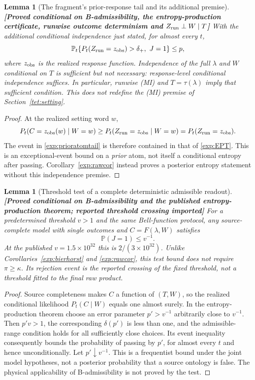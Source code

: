 \documentclass[11pt,a4paper]{article}
\newtheorem{lemma}[theorem]{Lemma}
\theoremstyle{definition}
\theoremstyle{remark}\newtheorem{remark}[theorem]{Remark}
\newcommand{\status}[1]{\textbf{[#1]}\quad}
\newcommand{\Prb}{\mathbb P}
\begin{document}
\begin{lemma}[The fragment's prior-response tail and its additional premise]\label{exp:prioratom}
\status{Proved conditional on B-admissibility, the entropy-production certificate, runwise outcome determinism and $Z_{\rm run}\perp W\mid T$}
With the additional conditional independence just stated, for almost every $t$,
\begin{equation}\label{exp:prioratomtail}
 \Prb_t\{P_t(Z_{\rm run}=z_{\rm obs})>\delta_+,\ J=1\}\le p,
\end{equation}
where $z_{\rm obs}$ is the realized response function. Independence of the full $\lambda$ and $W$ conditional on $T$ is sufficient but not necessary: response-level conditional independence suffices. In particular, runwise (MI) and $T=\tau(\lambda)$ imply that sufficient condition. This does not redefine the (MI) premise of Section~\ref{tet:setting}.
\end{lemma}
\begin{proof}
At the realized setting word $w$,
\[
 P_t(C=z_{\rm obs}(w)\mid W=w)
 \ge P_t(Z_{\rm run}=z_{\rm obs}\mid W=w)
 =P_t(Z_{\rm run}=z_{\rm obs}).
\]
The event in \eqref{exp:prioratomtail} is therefore contained in that of \eqref{exp:EPT}. This is an exceptional-event bound on a \emph{prior} atom, not itself a conditional entropy after passing. Corollary~\ref{exp:rawcor} instead proves a posterior entropy statement without this independence premise.
\end{proof}

\begin{lemma}[Threshold test of a complete deterministic admissible readout]\label{exp:thresholdtest}
\status{Proved conditional on B-admissibility and the published entropy-production theorem; reported threshold crossing imported}
For a predetermined threshold $v>1$ and the same Bell-function protocol, any source-complete model with single outcomes and $C=F(\lambda,W)$ satisfies
\[
 \Prb(J=1)\le v^{-1}.
\]
At the published $v=1.5\times10^{32}$ this is $2/(3\times10^{32})$. Unlike Corollaries~\ref{exp:bierhorst} and \ref{exp:rawcor}, this test bound does not require $\pi\ge\kappa$. Its rejection event is the reported crossing of the fixed threshold, not a threshold fitted to the final raw product.
\end{lemma}
\begin{proof}
Source completeness makes $C$ a function of $(T,W)$, so the realized conditional likelihood $P_t(C\mid W)$ equals one almost surely. In the entropy-production theorem choose an error parameter $p'>v^{-1}$ arbitrarily close to $v^{-1}$. Then $p'v>1$, the corresponding $\delta(p')$ is less than one, and the admissible-range condition holds for all sufficiently close choices. Its event inequality consequently bounds the probability of passing by $p'$, for almost every $t$ and hence unconditionally. Let $p'\downarrow v^{-1}$.
This is a frequentist bound under the joint model hypotheses, not a posterior probability that a source ontology is false. The physical applicability of B-admissibility is not proved by the test.
\end{proof}
\end{document}
